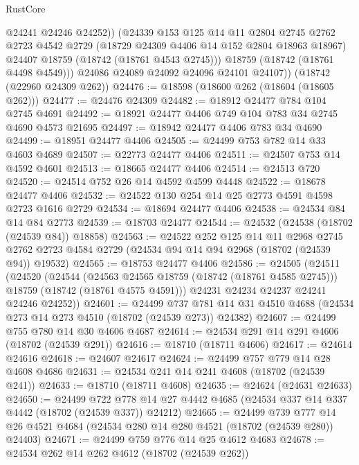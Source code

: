 \begin{lexlean}{RustCore}
\begin{coremodule}
              @24241
              @24246
              @24252))
          (@24339
            @153
            @125
            @14
            @11
            @2804
            @2745
            @2762
            @2723
            @4542
            @2729
            (@18729 @24309 @4406 @14 @152 @2804 @18963 @18967)
            @24407
            @18759
            (@18742 (@18761 @4543 @2745)))
          @18759
          (@18742 (@18761 @4498 @4549)))
        @24086
        @24089
        @24092
        @24096
        @24101
        @24107))
    (@18742 (@22960 @24309 @262))
@24476 := @18598 (@18600 @262 (@18604 (@18605 @262)))
@24477 := @24476 @24309
@24482 := @18912 @24477 @784 @104 @2745 @4691
@24492 := @18921 @24477 @4406 @749 @104 @783 @34 @2745 @4690 @4573 @21695
@24497 := @18942 @24477 @4406 @783 @34 @4690
@24499 := @18951 @24477 @4406
@24505 := @24499 @753 @782 @14 @33 @4603 @4689
@24507 := @22773 @24477 @4406
@24511 := @24507 @753 @14 @4592 @4601
@24513 := @18665 @24477 @4406
@24514 := @24513 @720
@24520 := @24514 @752 @26 @14 @4592 @4599 @4448
@24522 := @18678 @24477 @4406
@24532 := @24522 @130 @254 @14 @25 @2773 @4591 @4598 @2723 @1616 @2729
@24534 := @18694 @24477 @4406
@24538 := @24534 @84 @14 @84 @2773
@24539 := @18703 @24477
@24544 := @24532 (@24538 (@18702 (@24539 @84)) @18858)
@24563 := @24522
    @252
    @125
    @14
    @11
    @2968
    @2745
    @2762
    @2723
    @4584
    @2729
    (@24534 @94 @14 @94 @2968 (@18702 (@24539 @94)) @19532)
@24565 := @18753 @24477 @4406
@24586 := @24505
    (@24511
      (@24520
        (@24544
          (@24563 @24565 @18759 (@18742 (@18761 @4585 @2745)))
          @18759
          (@18742 (@18761 @4575 @4591)))
        @24231
        @24234
        @24237
        @24241
        @24246
        @24252))
@24601 := @24499
    @737
    @781
    @14
    @31
    @4510
    @4688
    (@24534 @273 @14 @273 @4510 (@18702 (@24539 @273)) @24382)
@24607 := @24499 @755 @780 @14 @30 @4606 @4687
@24614 := @24534 @291 @14 @291 @4606 (@18702 (@24539 @291))
@24616 := @18710 (@18711 @4606)
@24617 := @24614 @24616
@24618 := @24607 @24617
@24624 := @24499 @757 @779 @14 @28 @4608 @4686
@24631 := @24534 @241 @14 @241 @4608 (@18702 (@24539 @241))
@24633 := @18710 (@18711 @4608)
@24635 := @24624 (@24631 @24633)
@24650 := @24499
    @722
    @778
    @14
    @27
    @4442
    @4685
    (@24534 @337 @14 @337 @4442 (@18702 (@24539 @337)) @24212)
@24665 := @24499
    @739
    @777
    @14
    @26
    @4521
    @4684
    (@24534 @280 @14 @280 @4521 (@18702 (@24539 @280)) @24403)
@24671 := @24499 @759 @776 @14 @25 @4612 @4683
@24678 := @24534 @262 @14 @262 @4612 (@18702 (@24539 @262))

\end{coremodule}
\end{lexlean}
